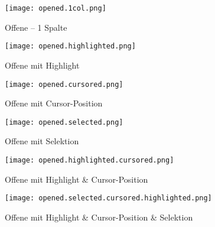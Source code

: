 \begin{figure}[!htb]
    \centering
    \begin{minipage}[b]{0.45\textwidth}
        \centering
        \texttt{[image: opened.1col.png]}
        \caption{\centering Offene  – 1 Spalte}
        \label{img:openedOneColNewComp}
    \end{minipage}
    \hfill
    \begin{minipage}[b]{0.45\textwidth}
        \centering
        \texttt{[image: opened.highlighted.png]}
        \caption{\centering Offene  mit Highlight}
        \label{img:openedHighlightedNewComp}
    \end{minipage}
\end{figure}

\begin{figure}[!htb]
    \centering
    \begin{minipage}[b]{0.45\textwidth}
        \centering
        \texttt{[image: opened.cursored.png]}
        \caption{\centering Offene  mit Cursor-Position}
        \label{img:openedCursoredNewComp}
    \end{minipage}
    \hfill
    \begin{minipage}[b]{0.45\textwidth}
        \centering
        \texttt{[image: opened.selected.png]}
        \caption{\centering Offene  mit Selektion}
        \label{img:openedSelectedNewComp}
    \end{minipage}
\end{figure}

\begin{figure}[!htb]
    \centering
    \begin{minipage}[b]{0.45\textwidth}
        \centering
        \texttt{[image: opened.highlighted.cursored.png]}
        \caption{\centering Offene  mit Highlight \& Cursor-Position}
        \label{img:openedHighlightedCursoredNewComp}
    \end{minipage}
    \hfill
    \begin{minipage}[b]{0.45\textwidth}
        \centering
        \texttt{[image: opened.selected.cursored.highlighted.png]}
        \caption{\centering Offene  mit Highlight \& Cursor-Position \& Selektion}
        \label{img:openedHighlightedCursoredSelectedNewComp}
    \end{minipage}
\end{figure}


